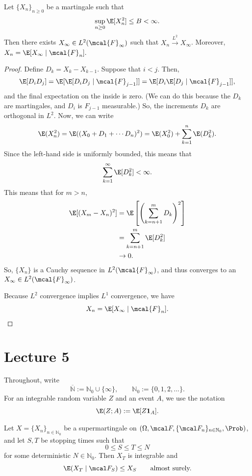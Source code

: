 \begin{theorem}
Let $\{X_n\}_{n\geq 0}$ be a martingale such that
\[
    \sup_{n\geq 0}\E[X_n^2]\leq B<\infty.
\]
Then there exists $X_\infty\in L^2(\mcal{F}_\infty)$ such that $X_n \overset{L^2}{\to} X_{\infty}$.
Moreover, \(X_n=\E[X_\infty\mid\mcal{F}_n].\)
\end{theorem}
\begin{proof}
Define $D_k = X_k - X_{k-1}$. Suppose that $i < j$. Then,
\[
\E[D_i D_j] = \E[\E[D_i D_j \mid \mcal{F}_{j-1}]]  = \E[D_i \E[D_j \mid \mcal{F}_{j-1}]],
\]
and the final expectation on the inside is zero. (We can do this because the $D_k$ are martingales, and $D_i$ is $F_{j-1}$ measurable.)
So, the increments $D_k$ are orthogonal in $L^2$. Now, we can write
\[
\E(X_n^2) = \E((X_0 +D_1 + \cdots D_n)^2) = \E(X_0^2) + \sum_{k=1}^n \E(D_k^2).
\]
Since the left-hand side is uniformly bounded, this means that
\[
\sum_{k=1}^{\infty} \E[D_k^2] < \infty.
\]
This means that for $m>n$,
\begin{align*}
\E[(X_m-X_n)^2] &= \E\left[\left(\sum_{k=n+1}^m D_k\right)^2\right] \\
&= \sum_{k=n+1}^m \E[D_k^2] \\
&\to 0.
\end{align*}
So, $\{X_n\}$ is a Cauchy sequence in $L^2(\mcal{F}_\infty)$, and thus converges to an $X_\infty \in L^2(\mcal{F}_\infty)$.

Because $L^2$ convergence implies $L^1$ convergence, we have
\[
X_n = \E[X_\infty \mid \mcal{F}_n].
\]
\end{proof}


\section{Lecture 5}

Throughout, write
\[
    \overline{\mathbb N}:=\mathbb N_0\cup\{\infty\},
    \qquad
    \mathbb N_0:=\{0,1,2,\ldots\}.
\]
For an integrable random variable $Z$ and an event $A$, we use the
notation
\[
    \E(Z;A):=\E[Z\mathbf{1}_A].
\]

\begin{theorem}
Let $X=\{X_n\}_{n\in\mathbb N_0}$ be a supermartingale on
$(\Omega,\mcal F,\{\mcal F_n\}_{n\in\mathbb N_0},\Prob)$, and let
$S,T$ be stopping times such that
\[
    0\leq S\leq T\leq N
\]
for some deterministic $N\in\mathbb N_0$. Then $X_T$ is integrable and
\[
    \E(X_T\mid\mcal F_S)\leq X_S
    \qquad\text{almost surely.}
\]
\end{theorem}

